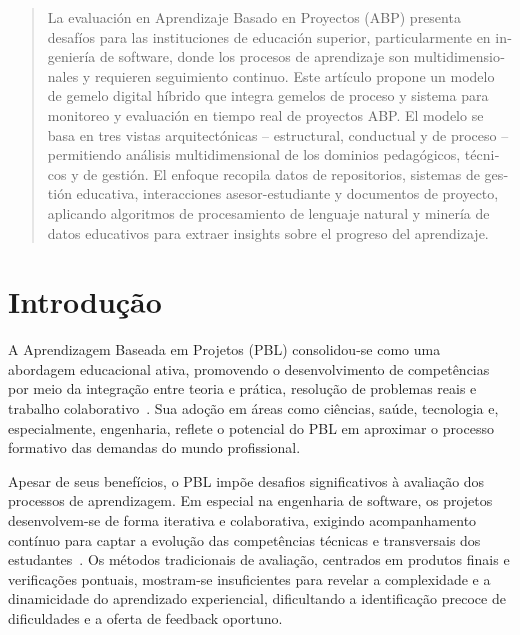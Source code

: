 \documentclass[english, spanish, brazilian]{modelo_dt}
\begin{document}
\begin{otherlanguage}{spanish}
\begin{abstract}
La evaluación en Aprendizaje Basado en Proyectos (ABP) presenta desafíos para las instituciones de educación superior, particularmente en ingeniería de software, donde los procesos de aprendizaje son multidimensionales y requieren seguimiento continuo\@. Este artículo propone un modelo de gemelo digital híbrido que integra gemelos de proceso y sistema para monitoreo y evaluación en tiempo real de proyectos ABP\@. El modelo se basa en tres vistas arquitectónicas -- estructural, conductual y de proceso -- permitiendo análisis multidimensional de los dominios pedagógicos, técnicos y de gestión\@. El enfoque recopila datos de repositorios, sistemas de gestión educativa, interacciones asesor-estudiante y documentos de proyecto, aplicando algoritmos de procesamiento de lenguaje natural y minería de datos educativos para extraer insights sobre el progreso del aprendizaje\@.
\end{abstract}
\end{otherlanguage}

\pagebreak

\section{Introdução}

A Aprendizagem Baseada em Projetos (PBL) consolidou-se como uma abordagem educacional ativa, promovendo o desenvolvimento de competências por meio da integração entre teoria e prática, resolução de problemas reais e trabalho colaborativo~\parencite{zhang2023effectiveness, khuankrue2017agent}. Sua adoção em áreas como ciências, saúde, tecnologia e, especialmente, engenharia, reflete o potencial do PBL em aproximar o processo formativo das demandas do mundo profissional.

Apesar de seus benefícios, o PBL impõe desafios significativos à avaliação dos processos de aprendizagem. Em especial na engenharia de software, os projetos desenvolvem-se de forma iterativa e colaborativa, exigindo acompanhamento contínuo para captar a evolução das competências técnicas e transversais dos estudantes~\parencite{kumar2022development}. Os métodos tradicionais de avaliação, centrados em produtos finais e verificações pontuais, mostram-se insuficientes para revelar a complexidade e a dinamicidade do aprendizado experiencial, dificultando a identificação precoce de dificuldades e a oferta de feedback oportuno.
\end{document}
